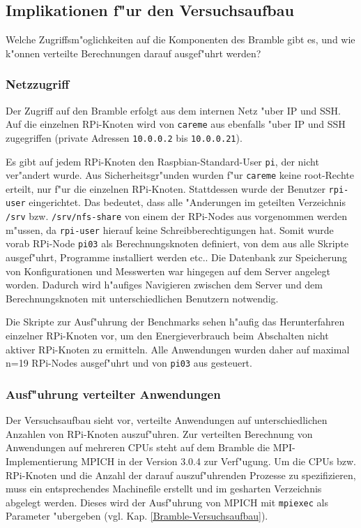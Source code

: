 \subsection{Implikationen f"ur den Versuchsaufbau}\label{Versuchsaufbau}

Welche Zugriffsm"oglichkeiten auf die Komponenten des Bramble gibt es, und wie k"onnen verteilte Berechnungen darauf ausgef"uhrt werden? 

\subsubsection{Netzzugriff}

Der Zugriff auf den Bramble erfolgt aus dem internen Netz "uber IP und SSH. Auf die einzelnen RPi-Knoten wird von \texttt{careme} aus ebenfalls "uber IP und SSH zugegriffen (private Adressen \texttt{10.0.0.2} bis \texttt{10.0.0.21}). 


Es gibt auf jedem RPi-Knoten den Raspbian-Standard-User \texttt{pi}, der nicht ver"andert wurde. Aus Sicherheitsgr"unden wurden f"ur \texttt{careme} keine root-Rechte erteilt, nur f"ur die einzelnen RPi-Knoten. Stattdessen wurde der Benutzer \texttt{rpi-user} eingerichtet. Das bedeutet, dass alle "Anderungen im geteilten Verzeichnis \texttt{/srv} bzw. \texttt{/srv/nfs-share} von einem der RPi-Nodes aus vorgenommen werden m"ussen, da \texttt{rpi-user} hierauf keine Schreibberechtigungen hat. Somit wurde vorab RPi-Node \texttt{pi03} als Berechnungsknoten definiert, von dem aus alle Skripte ausgef"uhrt, Programme installiert werden etc.. Die Datenbank zur Speicherung von Konfigurationen und Messwerten war hingegen auf dem Server angelegt worden. Dadurch wird h"aufiges Navigieren zwischen dem Server und dem Berechnungsknoten mit unterschiedlichen Benutzern notwendig.

Die Skripte zur Ausf"uhrung der Benchmarks sehen h"aufig das Herunterfahren einzelner RPi-Knoten vor, um den Energieverbrauch beim Abschalten nicht aktiver RPi-Knoten zu ermitteln. Alle Anwendungen wurden daher auf maximal n=19 RPi-Nodes ausgef"uhrt und von \texttt{pi03} aus gesteuert. 

\subsubsection{Ausf"uhrung verteilter Anwendungen}

Der Versuchsaufbau sieht vor, verteilte Anwendungen auf unterschiedlichen Anzahlen von RPi-Knoten auszuf"uhren. Zur verteilten Berechnung von Anwendungen auf mehreren CPUs steht auf dem Bramble die MPI-Implementierung MPICH in der Version 3.0.4 zur Verf"ugung. Um die CPUs bzw. RPi-Knoten und die Anzahl der darauf auszuf"uhrenden Prozesse zu spezifizieren, muss ein entsprechendes Machinefile erstellt und im gesharten Verzeichnis abgelegt werden. Dieses wird der Ausf"uhrung von MPICH mit \texttt{mpiexec} als Parameter "ubergeben (vgl. Kap. \ref{Bramble-Versuchsaufbau}). 
\endinput 